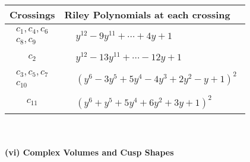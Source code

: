 \documentclass[1p]{elsarticle_modified}
\theoremstyle{definition}
\begin{document}
\begin{tabular}{m{50pt}|m{274pt}}
Crossings & \hspace{64pt}Riley Polynomials at each crossing \\
\hline $$\begin{aligned}c_{1},c_{4},c_{6}\\c_{8},c_{9}\end{aligned}$$&$\begin{aligned}
&y^{12}-9 y^{11}+\cdots+4 y+1
\end{aligned}$\\
\hline $$\begin{aligned}c_{2}\end{aligned}$$&$\begin{aligned}
&y^{12}-13 y^{11}+\cdots-12 y+1
\end{aligned}$\\
\hline $$\begin{aligned}c_{3},c_{5},c_{7}\\c_{10}\end{aligned}$$&$\begin{aligned}
&(y^6-3 y^5+5 y^4-4 y^3+2 y^2- y+1)^2
\end{aligned}$\\
\hline $$\begin{aligned}c_{11}\end{aligned}$$&$\begin{aligned}
&(y^6+y^5+5 y^4+6 y^2+3 y+1)^2
\end{aligned}$\\
\hline
\end{tabular}\\~\\
\newpage\flushleft \textbf{(vi) Complex Volumes and Cusp Shapes}
\end{document}
